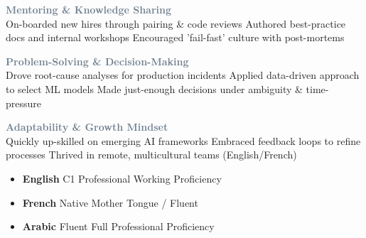 \documentclass[9pt,a4paper,ragged2e]{altacv}
\begin{document}
\begin{paracol}{2}
\textcolor{SlateGrey}{\textbf{Mentoring \& Knowledge Sharing}}\\
On-boarded new hires through pairing \& code reviews \textbar{} Authored best-practice docs and internal workshops \textbar{} Encouraged 'fail-fast' culture with post-mortems

\vspace{1pt}

\textcolor{SlateGrey}{\textbf{Problem-Solving \& Decision-Making}}\\
Drove root-cause analyses for production incidents \textbar{} Applied data-driven approach to select ML models \textbar{} Made just-enough decisions under ambiguity \& time-pressure

\vspace{1pt}

\textcolor{SlateGrey}{\textbf{Adaptability \& Growth Mindset}}\\
Quickly up-skilled on emerging AI frameworks \textbar{} Embraced feedback loops to refine processes \textbar{} Thrived in remote, multicultural teams (English/French)

\vspace{2pt}
\begin{itemize}
  \item \textbf{English} \hfill C1 Professional Working Proficiency
  \item \textbf{French} \hfill Native Mother Tongue / Fluent
  \item \textbf{Arabic} \hfill Fluent Full Professional Proficiency
\end{itemize}
\end{paracol}
\end{document}
